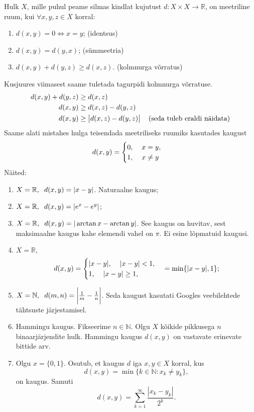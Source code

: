 \documentclass{article}[12pt]
\newcommand{\h}{\hspace{0.2cm}}
\newcommand{\R}{\mathbb{R}}
\newcommand{\N}{\mathbb{N}}
\theoremstyle{definition}
\theoremstyle{definition}
\theoremstyle{definition}
\theoremstyle{break}
\begin{document}
Hulk $X$, mille puhul peame silmas kindlat kujutust $d: X\times X\rightarrow \R$, on meetriline ruum, kui $\forall x,y,z\in X$ korral:
\begin{enumerate}
	\item $d(x,y)=0 \Leftrightarrow x=y$; \hfill (identsus)
	\item $d(x,y) = d(y,x)$; \hfill (sümmeetria)
	\item $d(x,y) + d(y,z) \geq d(x,z)$. \hfill (kolmnurga võrratus)
\end{enumerate}
Kusjuures viimasest saame tuletada tagurpidi kolmnurga võrratuse.
\begin{align*}
	d(x,y) + d(y,z) &\geq d(x,z) \\
	d(x,y) &\geq d(x,z) - d(y,z) \\
	d(x,y) &\geq \big\lvert d(x,z) - d(y,z) \big\rvert \h\h\text{(seda tuleb eraldi näidata)} \\
\end{align*} 
Saame alati mistahes hulga teisendada meetriliseks ruumiks kasutades kaugust
\[
	d(x,y) = \begin{cases}
		0,\h\h x=y, \\
		1,\h\h x\neq y
	\end{cases}
\]
Näited:
\begin{enumerate}
	\item $X=\R,\h d(x,y) = |x-y|$. Naturaalne kaugus;
	\item $X=\R,\h d(x,y) = |e^x-e^y|$;
	\item $X=\R,\h d(x,y) = |\arctan x - \arctan y|$. See kaugus on huvitav, sest maksimaalne kaugus kahe elemendi vahel on $\pi$. Ei esine lõpmatuid kaugusi.
	\item $X=\R,$
	\[
		d(x,y) = \begin{cases}
			|x-y|,\h\h |x-y| < 1, \\
			1,\h\h |x-y| \geq 1, \\
		\end{cases} = \min \{ |x-y|, 1 \};
	\]
	\item $X=\N,\h d(m,n) = \bigg\lvert \frac{1}{m} - \frac{1}{n} \bigg\rvert$. Seda kaugust kasutati Googles veebilehtede tähtsuste järjestamisel.
	\item Hammingu kaugus.
	Fikseerime $n\in \N$. 
	Olgu $X$ kõikide pikkusega $n$ binaarjärjendite hulk. 
	Hammingu kaugus $d(x,y)$ on vastavate erinevate bittide arv.
	\item Olgu $x=\{0,1\}$. Osutub, et kaugus $d$ iga $x,y\in X$ korral, kus
	\[
		d(x,y) = \min \{ k\in \N: x_k \neq y_k \},
	\]
	on kaugus. Samuti
	\[
		d(x,y) = \sum_{k=1}^\infty \frac{ |x_k-y_k| }{2^k}.
	\]
\end{enumerate}
\end{document}
